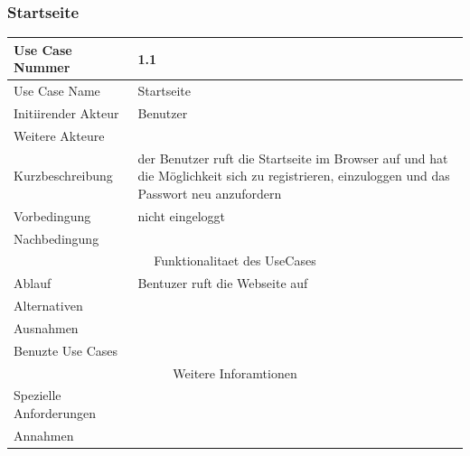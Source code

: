 \documentclass[10pt,a4paper]{article}
\begin{document}
	\subsubsection{Startseite}
	\begin{tabular}{|l|p{.5\linewidth}|}
	\hline Use Case Nummer & 1.1 \\ 
	\hline Use Case Name & Startseite \\ 
	\hline Initiirender Akteur & Benutzer \\
	\hline Weitere Akteure &  \\
	\hline Kurzbeschreibung & der Benutzer ruft die Startseite im Browser auf und hat die M\"oglichkeit sich zu registrieren, einzuloggen und das Passwort neu anzufordern \\
	\hline Vorbedingung & nicht eingeloggt \\
	\hline Nachbedingung &  \\
	\hline \multicolumn{2}{|c|}{Funktionalitaet des UseCases}\\
	\hline Ablauf & Bentuzer ruft die Webseite auf \\
	\hline Alternativen &  \\
	\hline Ausnahmen &  \\
	\hline Benuzte Use Cases &  \\
	\hline \multicolumn{2}{|c|}{Weitere Inforamtionen} \\
	\hline Spezielle Anforderungen &  \\
	\hline Annahmen &  \\
	\hline
	\end{tabular} 
\end{document}
